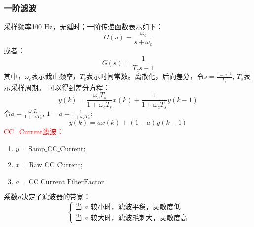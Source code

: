     \subsubsection*{一阶滤波}
        采样频率100 Hz，无延时；一阶传递函数表示如下：
            \begin{equation}
                G(s) = \frac{\omega_c}{s+\omega_c}
                \label{eq:CC2}
            \end{equation}
        或者：
            \begin{equation}
                G(s) = \frac{1}{T_cs+1}
                \label{eq:CC3}
            \end{equation}
        其中，$\omega_c$表示截止频率，$T_c$表示时间常数。离散化，后向差分，令$s = \frac{1-z^{-1}}{T_s}$, $T_s$表示采样周期。
        可以得到差分方程：
            \begin{equation}
                y(k) = \frac{\omega_cT_s}{1+\omega_cT_s}x(k)+\frac{1}{1+\omega_cT_s}y(k-1)
            \end{equation}
        令$a = \frac{\omega_cT_s}{1+\omega_cT_s}$, $1-a = \frac{1}{1+\omega_cT_s} $:
            \begin{equation}
                y(k) = ax(k)+(1-a)y(k-1)
                \label{eq:CC4}
            \end{equation}
        \textcolor{red}{CC\_Current滤波：}
            \begin{enumerate}[label={}]
                \item $y = \mathrm{Samp\_CC\_Current} $;
                \item $x = \mathrm{Raw\_CC\_Current} $;
                \item $a = \mathrm{CC\_Current\_FilterFactor}$
            \end{enumerate}
        系数$a$决定了滤波器的带宽：
            \begin{equation}
                \begin{cases}
                    \text{当 $a$ 较小时，滤波平稳，灵敏度低}\\
                    \text{当 $a$ 较大时，滤波毛刺大，灵敏度高}
                \end{cases}
            \end{equation}
    
   
        










